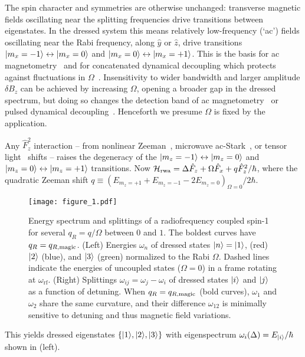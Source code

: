 \documentclass[aps,prl,reprint,superscriptaddress,floatfix]{revtex4-1}
\begin{document}
The spin character and symmetries are otherwise unchanged: transverse magnetic fields oscillating near the splitting frequencies drive transitions between eigenstates.
In the dressed system this means relatively low-frequency (`ac') fields oscillating near the Rabi frequency, along $\hat{y}$ or $\hat{z}$, drive transitions $\vert m_x=-1 \rangle  \leftrightarrow \vert m_x=0 \rangle $ and $\vert m_x=0 \rangle  \leftrightarrow \vert m_x=+1 \rangle $.
This is the basis for ac magnetometry~\cite{hirose_continuous_2012} and for concatenated dynamical decoupling  which protects against fluctuations in $\Omega$~\cite{cai_robust_2012}.
Insensitivity to wider bandwidth and larger amplitude $\delta B_z$ can be achieved by increasing $\Omega$, opening a broader gap in the dressed spectrum, but doing so changes the detection band of ac magnetometry~\cite{loretz_radio-frequency_2013} or pulsed dynamical decoupling~\cite{boss_quantum_2017,*schmitt_submillihertz_2017}.
Henceforth we presume $\Omega$ is fixed by the application.

Any $\hat{F}_z^2$ interaction -- from nonlinear Zeeman~\cite{ramsey_molecular_1956}, microwave ac-Stark~\cite{gerbier_resonant_2006}, or tensor light~\cite{smith_continuous_2004} shifts -- raises the degeneracy of the $\vert m_z=-1 \rangle  \leftrightarrow \vert m_z=0 \rangle $ and $\vert m_z=0 \rangle  \leftrightarrow \vert m_z=+1 \rangle $ transitions. 
Now $\mathcal{H}_{\text{rwa}} = \Delta \hat{F}_z + \Omega \hat{F}_x + q \hat{F}_z^2/\hbar$, where the quadratic Zeeman shift $q \equiv (E_{m_z=+1} + E_{m_z=-1} - 2 E_{m_z=0})_{\Omega=0}/2\hbar$.
\begin{figure}
    \texttt{[image: figure\_1.pdf]}
    \caption{
    \label{fig:eigensystem_schematic}
        Energy spectrum and splittings of a radiofrequency coupled spin-1 for several $q_R = q/\Omega$ between $0$ and $1$.
        The boldest curves have $q_R = q_{R,\text{magic}}$.
        (Left) Energies $\omega_n$ of dressed states $\vert n \rangle =\vert 1 \rangle $, (red) $\vert 2 \rangle $ (blue), and $\vert 3 \rangle $ (green) normalized to the Rabi $\Omega$.
        Dashed lines indicate the energies of uncoupled states ($\Omega=0$) in a frame rotating at $\omega_{\text{rf}}$.
        (Right) Splittings $\omega_{ij} = \omega_j - \omega_i$ of dressed states $\vert i \rangle $ and $\vert j \rangle $ as a function of detuning.
        When $q_R=q_{R,\text{magic}}$ (bold curves), $\omega_1$ and $\omega_2$ share the same curvature, and their difference $\omega_{12}$ is minimally sensitive to detuning and thus magnetic field variations.
    }
\end{figure}
This yields dressed eigenstates $\{\vert 1 \rangle , \vert 2 \rangle , \vert 3 \rangle \}$ with eigenspectrum $\omega_i(\Delta) = E_{\vert i \rangle }/\hbar$ shown in  (left).
\end{document}
